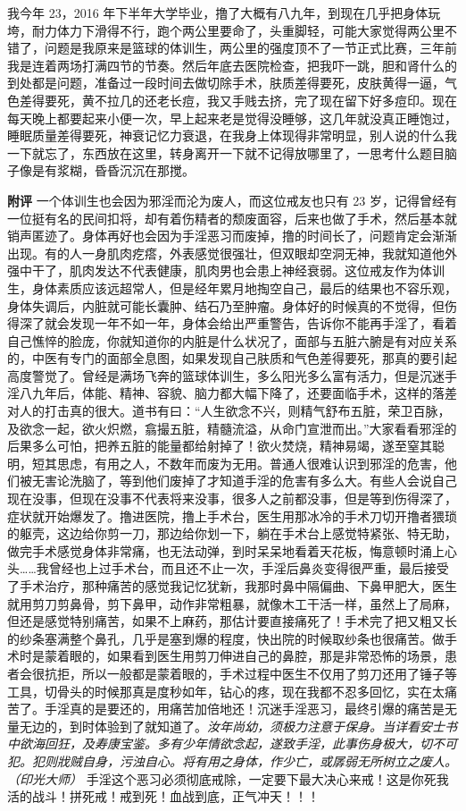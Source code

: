 \begin{case}
    我今年 23，2016 年下半年大学毕业，撸了大概有八九年，到现在几乎把身体玩垮，耐力体力下滑得不行，跑个两公里要命了，头重脚轻，可能大家觉得两公里不错了，问题是我原来是篮球的体训生，两公里的强度顶不了一节正式比赛，三年前我是连着两场打满四节的节奏。然后年底去医院检查，把我吓一跳，胆和肾什么的到处都是问题，准备过一段时间去做切除手术，肤质差得要死，皮肤黄得一逼，气色差得要死，黄不拉几的还老长痘，我又手贱去挤，完了现在留下好多痘印。现在每天晚上都要起来小便一次，早上起来老是觉得没睡够，这几年就没真正睡饱过，睡眠质量差得要死，神衰记忆力衰退，在我身上体现得非常明显，别人说的什么我一下就忘了，东西放在这里，转身离开一下就不记得放哪里了，一思考什么题目脑子像是有浆糊，昏昏沉沉在那搅。

    \textbf{附评} 一个体训生也会因为邪淫而沦为废人，而这位戒友也只有 23 岁，记得曾经有一位挺有名的民间扣将，却有着伤精者的颓废面容，后来也做了手术，然后基本就销声匿迹了。身体再好也会因为手淫恶习而废掉，撸的时间长了，问题肯定会渐渐出现。有的人一身肌肉疙瘩，外表感觉很强壮，但双眼却空洞无神，我就知道他外强中干了，肌肉发达不代表健康，肌肉男也会患上神经衰弱。这位戒友作为体训生，身体素质应该远超常人，但是经年累月地掏空自己，最后的结果也不容乐观，身体失调后，内脏就可能长囊肿、结石乃至肿瘤。身体好的时候真的不觉得，但伤得深了就会发现一年不如一年，身体会给出严重警告，告诉你不能再手淫了，看着自己憔悴的脸庞，你就知道你的内脏是什么状况了，面部与五脏六腑是有对应关系的，中医有专门的面部全息图，如果发现自己肤质和气色差得要死，那真的要引起高度警觉了。曾经是满场飞奔的篮球体训生，多么阳光多么富有活力，但是沉迷手淫八九年后，体能、精神、容貌、脑力都大幅下降了，还要面临手术，这样的落差对人的打击真的很大。道书有曰：“人生欲念不兴，则精气舒布五脏，荣卫百脉，及欲念一起，欲火炽燃，翕撮五脏，精髓流溢，从命门宣泄而出。”大家看看邪淫的后果多么可怕，把养五脏的能量都给射掉了！欲火焚烧，精神易竭，遂至窒其聪明，短其思虑，有用之人，不数年而废为无用。普通人很难认识到邪淫的危害，他们被无害论洗脑了，等到他们废掉了才知道手淫的危害有多么大。有些人会说自己现在没事，但现在没事不代表将来没事，很多人之前都没事，但是等到伤得深了，症状就开始爆发了。撸进医院，撸上手术台，医生用那冰冷的手术刀切开撸者猥琐的躯壳，这边给你剪一刀，那边给你划一下，躺在手术台上感觉特紧张、特无助，做完手术感觉身体非常痛，也无法动弹，到时呆呆地看着天花板，悔意顿时涌上心头……我曾经也上过手术台，而且还不止一次，手淫后鼻炎变得很严重，最后接受了手术治疗，那种痛苦的感觉我记忆犹新，我那时鼻中隔偏曲、下鼻甲肥大，医生就用剪刀剪鼻骨，剪下鼻甲，动作非常粗暴，就像木工干活一样，虽然上了局麻，但还是感觉特别痛苦，如果不上麻药，那估计要直接痛死了！手术完了把又粗又长的纱条塞满整个鼻孔，几乎是塞到爆的程度，快出院的时候取纱条也很痛苦。做手术时是蒙着眼的，如果看到医生用剪刀伸进自己的鼻腔，那是非常恐怖的场景，患者会很抗拒，所以一般都是蒙着眼的，手术过程中医生不仅用了剪刀还用了锤子等工具，切骨头的时候那真是度秒如年，钻心的疼，现在我都不忍多回忆，实在太痛苦了。手淫真的是要还的，用痛苦加倍地还！沉迷手淫恶习，最终引爆的痛苦是无量无边的，到时体验到了就知道了。\textit{汝年尚幼，须极力注意于保身。当详看安士书中欲海回狂，及寿康宝鉴。多有少年情欲念起，遂致手淫，此事伤身极大，切不可犯。犯则戕贼自身，污浊自心。将有用之身体，作少亡，或孱弱无所树立之废人。（印光大师）} 手淫这个恶习必须彻底戒除，一定要下最大决心来戒！这是你死我活的战斗！拼死戒！戒到死！血战到底，正气冲天！！！
\end{case}

